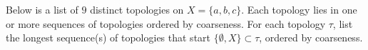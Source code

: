 \ea

\begin{comment}

\ExerciseSolution

\ba

\item Let $x \in X$. Since $X$ is finite, there are only finitely many open sets that contain $x$. The fact that the intersection of a finite number of open sets is open implies that $U_x$ is an open set.

\item If $x \in X$, then $x \in U_x$. Now let $B_1 = U_x$ and $B_2 = U_y$ for some $x$, $y$ in $X$, and suppose $z \in B_1 \cap B_2$. Then $B_1 \cap B_2$ is an open set that contains $z$ and so $U_z \subseteq B_1 \cap B_2$. So $\B_{\text{min}}$ is a basis for $\tau$. 

\item Let $\B$ be a basis for $\tau$. To show that $\B_{\text{min}} \subseteq \B$, let $U_x$ be an element of $\B_{\text{min}}$ we will show that $U_x \in \B$. The fact that $U_x \in \tau$ means that $U_x$ is a union of basis elements from $\B$. That is, there is a set $U \in \B$ such that $x \in U \subseteq U_x$. But $U_x$ is the intersection of all open sets that contain $x$, so it follows that $C = U_x$ and $U_x \in \B$. 
 
\item The minimal basis for $\tau$ is the set $\{U_a, U_b, U_c, U_d\}$. Since $\{a\}$ is in $\tau$, it follows that $U_a = \{a\}$. Also
\begin{align*}
U_b &= \{a,b\} \cap \{a,b,c\} \cap \{a,b,d\} \cap X = \{a,b\} \\
U_c &= \{a,c\} \cap \{a,b,c\} \cap \{a,c,d\} \cap X = \{a,c\} \\
U_d &= \{a,d\} \cap \{a,b,d\} \cap \{a,c,d\} \cap X = \{a,d\}.
\end{align*}
So the minimal basis for $\tau$ is $\{\{a\}, \{a,b\}, \{a,c\}, \{a,d\}\}$. 

\ea

\end{comment}

\item Below is a list of $9$ distinct topologies on $X = \{a,b,c\}$. Each topology lies in one or more sequences of topologies ordered by coarseness. For each topology $\tau$, list the longest sequence(s) of topologies that start $\{\emptyset, X\} \subset \tau$, ordered by coarseness. 

